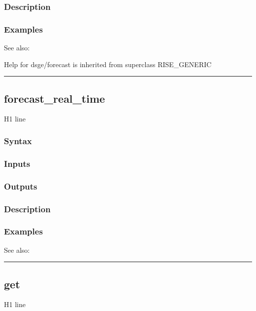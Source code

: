 \documentclass[letterpaper,10pt,english]{sphinxmanual}
\begin{document}
\subsubsection{Description}
\label{classes/models/@dsge/dsge:id42}

\subsubsection{Examples}
\label{classes/models/@dsge/dsge:id43}
See also:

Help for dsge/forecast is inherited from superclass RISE\_GENERIC


\bigskip\hrule{}\bigskip



\subsection{forecast\_real\_time}
\label{classes/models/@dsge/dsge:id44}\label{classes/models/@dsge/dsge:forecast-real-time}
H1 line


\subsubsection{Syntax}
\label{classes/models/@dsge/dsge:id45}

\subsubsection{Inputs}
\label{classes/models/@dsge/dsge:id46}

\subsubsection{Outputs}
\label{classes/models/@dsge/dsge:id47}

\subsubsection{Description}
\label{classes/models/@dsge/dsge:id48}

\subsubsection{Examples}
\label{classes/models/@dsge/dsge:id49}
See also:


\bigskip\hrule{}\bigskip



\subsection{get}
\label{classes/models/@dsge/dsge:id50}\label{classes/models/@dsge/dsge:get}
H1 line
\end{document}
